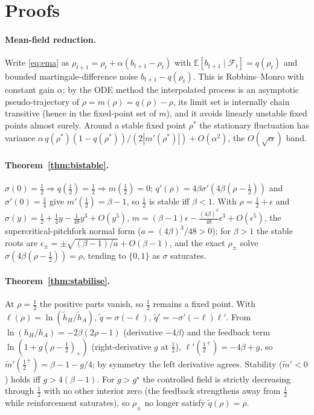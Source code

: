 \documentclass[11pt]{article}
\theoremstyle{definition}
\theoremstyle{remark}
\newcommand{\E}{\mathbb{E}}
\newcommand{\F}{\mathcal{F}}
\begin{document}
\appendix
\section{Proofs}\label{app:proofs}

\paragraph{Mean-field reduction.} Write \eqref{eq:ema} as $\rho_{t+1}=\rho_t+\alpha(b_{t+1}-\rho_t)$ with $\E[b_{t+1}\mid\F_t]=q(\rho_t)$ and bounded martingale-difference noise $b_{t+1}-q(\rho_t)$. This is Robbins--Monro with constant gain $\alpha$; by the ODE method \citep{benaim1999,kushner2003} the interpolated process is an asymptotic pseudo-trajectory of $\dot\rho=m(\rho)=q(\rho)-\rho$, its limit set is internally chain transitive (hence in the fixed-point set of $m$), and it avoids linearly unstable fixed points almost surely. Around a stable fixed point $\rho^\ast$ the stationary fluctuation has variance $\alpha\,q(\rho^\ast)(1-q(\rho^\ast))/(2|m'(\rho^\ast)|)+O(\alpha^2)$, the $O(\sqrt\alpha)$ band.

\paragraph{Theorem~\ref{thm:bistable}.} $\sigma(0)=\tfrac12\Rightarrow q(\tfrac12)=\tfrac12\Rightarrow m(\tfrac12)=0$; $q'(\rho)=4\beta\sigma'(4\beta(\rho-\tfrac12))$ and $\sigma'(0)=\tfrac14$ give $m'(\tfrac12)=\beta-1$, so $\tfrac12$ is stable iff $\beta<1$. With $\rho=\tfrac12+\epsilon$ and $\sigma(y)=\tfrac12+\tfrac14 y-\tfrac1{48}y^3+O(y^5)$, $m=(\beta-1)\epsilon-\tfrac{(4\beta)^3}{48}\epsilon^3+O(\epsilon^5)$, the supercritical-pitchfork normal form ($a=(4\beta)^3/48>0$); for $\beta>1$ the stable roots are $\epsilon_\pm=\pm\sqrt{(\beta-1)/a}+O(\beta-1)$, and the exact $\rho_\pm$ solve $\sigma(4\beta(\rho-\tfrac12))=\rho$, tending to $\{0,1\}$ as $\sigma$ saturates.

\paragraph{Theorem~\ref{thm:stabilise}.} At $\rho=\tfrac12$ the positive parts vanish, so $\tfrac12$ remains a fixed point. With $\ell(\rho)=\ln(\tilde h_H/\tilde h_A)$, $\tilde q=\sigma(-\ell)$, $\tilde q'=-\sigma'(-\ell)\ell'$. From $\ln(h_H/h_A)=-2\beta(2\rho-1)$ (derivative $-4\beta$) and the feedback term $\ln(1+g(\rho-\tfrac12)_+)$ (right-derivative $g$ at $\tfrac12$), $\ell'(\tfrac12^+)=-4\beta+g$, so $\tilde m'(\tfrac12^+)=\beta-1-g/4$; by symmetry the left derivative agrees. Stability ($\tilde m'<0$) holds iff $g>4(\beta-1)$. For $g>g^\star$ the controlled field is strictly decreasing through $\tfrac12$ with no other interior zero (the feedback strengthens away from $\tfrac12$ while reinforcement saturates), so $\rho_\pm$ no longer satisfy $\tilde q(\rho)=\rho$.
\end{document}
